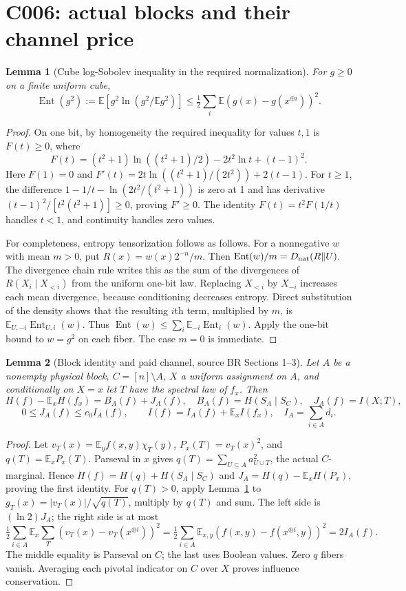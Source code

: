 \documentclass[11pt]{article}
\newtheorem{lemma}{Lemma}
\newcommand{\E}{\mathbb E}
\newcommand{\Ent}{\operatorname{Ent}}
\begin{document}
\section{C006: actual blocks and their channel price}
\begin{lemma}[Cube log-Sobolev inequality in the required normalization]
\label{lem:lsi}
For $g\ge0$ on a finite uniform cube,
\[
 \Ent(g^2):=\E[g^2\ln(g^2/\E g^2)]
 \le\tfrac12\sum_i\E(g(x)-g(x^{\oplus i}))^2.
\]
\end{lemma}
\begin{proof}
On one bit, by homogeneity the required inequality for values $t,1$
is $F(t)\ge0$, where
\[
F(t)=(t^2+1)\ln((t^2+1)/2)-2t^2\ln t+(t-1)^2.
\]
Here $F(1)=0$ and
$F'(t)=2t\ln((t^2+1)/(2t^2))+2(t-1)$.
For $t\ge1$, the difference
$1-1/t-\ln(2t^2/(t^2+1))$ is zero at 1 and has derivative
$(t-1)^2/[t^2(t^2+1)]\ge0$, proving $F'\ge0$.
The identity $F(t)=t^2F(1/t)$ handles $t<1$, and continuity
handles zero values.

For completeness, entropy tensorization follows as follows. For a
nonnegative $w$ with mean $m>0$, put $R(x)=w(x)2^{-n}/m$.
Then $\Ent(w)/m=D_{\rm nat}(R\|U)$.
The divergence chain rule writes this as the sum of the divergences
of $R(X_i\mid X_{<i})$ from the uniform one-bit law.
Replacing $X_{<i}$ by $X_{-i}$ increases each mean divergence,
because conditioning decreases entropy. Direct substitution of the
density shows that the resulting $i$th term, multiplied by $m$, is
$\E_{U,-i}\Ent_{U,i}(w)$.
Thus $\Ent(w)\le\sum_i\E_{-i}\Ent_i(w)$.
Apply the one-bit bound to $w=g^2$ on each fiber. The case $m=0$
is immediate.
\end{proof}

\begin{lemma}[Block identity and paid channel, source BR Sections 1--3]
\label{lem:block}
Let $A$ be a nonempty physical block, $C=[n]\setminus A$,
$X$ a uniform assignment on $A$, and conditionally on $X=x$ let
$T$ have the spectral law of $f_x$. Then
\[
H(f)-\E_xH(f_x)=B_A(f)+J_A(f),\quad
B_A(f)=H(S_A\mid S_C),\quad J_A(f)=I(X;T),
\]
\[
0\le J_A(f)\le c_0 I_A(f),\qquad
I(f)=I_A(f)+\E_xI(f_x),\quad I_A=\sum_{i\in A}d_i.
\]
\end{lemma}
\begin{proof}
Let $v_T(x)=\E_y f(x,y)\chi_T(y)$,
$P_x(T)=v_T(x)^2$, and $q(T)=\E_xP_x(T)$.
Parseval in $x$ gives $q(T)=\sum_{U\subseteq A}a_{U\cup T}^2$,
the actual $C$-marginal. Hence
$H(f)=H(q)+H(S_A\mid S_C)$ and
$J_A=H(q)-\E_xH(P_x)$, proving the first identity.
For $q(T)>0$, apply Lemma~\ref{lem:lsi} to
$g_T(x)=|v_T(x)|/\sqrt{q(T)}$, multiply by $q(T)$ and sum.
The left side is $(\ln2)J_A$; the right side is at most
\[
\tfrac12\sum_{i\in A}\E_x\sum_T(v_T(x)-v_T(x^{\oplus i}))^2
=\tfrac12\sum_{i\in A}\E_{x,y}(f(x,y)-f(x^{\oplus i},y))^2
=2I_A(f).
\]
The middle equality is Parseval on $C$; the last uses Boolean
values. Zero $q$ fibers vanish. Averaging each pivotal indicator
on $C$ over $X$ proves influence conservation.
\end{proof}
\end{document}
